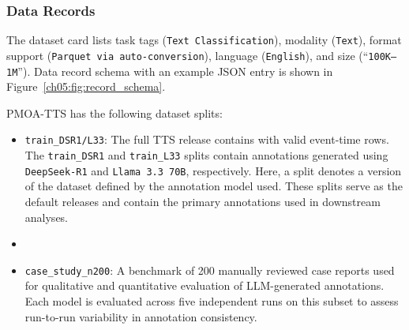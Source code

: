 \subsubsection{Data Records}
\label{ch05:sec:data-records}

The dataset card lists task tags (\texttt{Text Classification}), modality (\texttt{Text}), format support (\texttt{Parquet via auto-conversion}), language (\texttt{English}), and size (``\texttt{100K--1M}'').
Data record schema with an example JSON entry is shown in Figure~\ref{ch05:fig:record_schema}.

\noindent PMOA-TTS has the following dataset splits:

\begin{itemize}
    \item \texttt{train\_DSR1/L33}: The full TTS release contains  with valid event-time rows.
The \texttt{train\_DSR1} and \texttt{train\_L33} splits contain annotations generated using \texttt{DeepSeek-R1} and \texttt{Llama 3.3 70B}, respectively.
Here, a split denotes a version of the dataset defined by the annotation model used.
These splits serve as the default releases and contain the primary annotations used in downstream analyses.
    
    \item {\raggedright {}\par}
    
    \item \texttt{case\_study\_n200}: A benchmark of 200 manually reviewed case reports used for qualitative and quantitative evaluation of LLM-generated annotations.
Each model is evaluated across five independent runs on this subset to assess run-to-run variability in annotation consistency.

\end{itemize}


